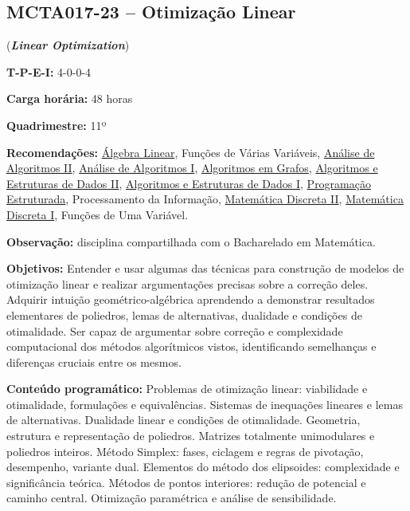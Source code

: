 \documentclass[class=article, crop=false]{standalone}
\begin{document}
\subsection*{MCTA017-23 -- Otimização Linear}
\label{disc:ol}

(\textbf{\textit{Linear Optimization}})

\begin{center}
    \begin{minipage}{0.85\textwidth}
        \textbf{T-P-E-I:} 4-0-0-4
        
        \textbf{Carga horária:} 48 horas
        
        \textbf{Quadrimestre:} 11º 
        
        \textbf{Recomendações:}
        \hyperref[disc:alge_lin]{Álgebra Linear},
        Funções de Várias Variáveis,
        \hyperref[disc:aaII]{Análise de Algoritmos II},
        \hyperref[disc:aaI]{Análise de Algoritmos I},
        \hyperref[disc:ag]{Algoritmos em Grafos},
        \hyperref[disc:aedII]{Algoritmos e Estruturas de Dados II},
        \hyperref[disc:aedI]{Algoritmos e Estruturas de Dados I},
        \hyperref[disc:pe]{Programação Estruturada},
        Processamento da Informação,
        \hyperref[disc:mdII]{Matemática Discreta II},
        \hyperref[disc:mdI]{Matemática Discreta I},
        Funções de Uma Variável.
        
        \textbf{Observação:} disciplina compartilhada com o Bacharelado em Matemática.
    \end{minipage}
\end{center}

\textbf{Objetivos:}
Entender e usar algumas das técnicas para construção de modelos de otimização
linear e realizar argumentações precisas sobre a correção deles. Adquirir
intuição geométrico-algébrica aprendendo a demonstrar resultados elementares de
poliedros, lemas de alternativas, dualidade e condições de otimalidade. Ser
capaz de argumentar sobre correção e complexidade computacional dos métodos
algorítmicos vistos, identificando semelhanças e diferenças cruciais entre os
mesmos.

\textbf{Conteúdo programático:} 
Problemas de otimização linear: viabilidade e otimalidade, formulações e equivalências.
Sistemas de inequações lineares e lemas de alternativas. 
Dualidade linear e condições de otimalidade.
Geometria, estrutura e representação de poliedros.
Matrizes totalmente unimodulares e poliedros inteiros.
Método Simplex: fases, ciclagem e regras de pivotação, desempenho, variante dual.
Elementos do método dos elipsoides: complexidade e significância teórica.
Métodos de pontos interiores: redução de potencial e caminho central.
Otimização paramétrica e análise de sensibilidade.
\end{document}
